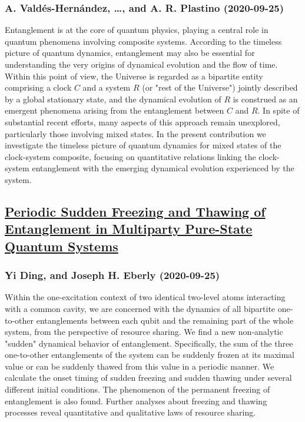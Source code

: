 \subsubsection*{A. Valdés-Hernández, \dots, and A. R. Plastino (2020-09-25)}
Entanglement is at the core of quantum physics, playing a central role in
quantum phenomena involving composite systems. According to the timeless
picture of quantum dynamics, entanglement may also be essential for
understanding the very origins of dynamical evolution and the flow of time.
Within this point of view, the Universe is regarded as a bipartite entity
comprising a clock $C$ and a system $R$ (or "rest of the Universe") jointly
described by a global stationary state, and the dynamical evolution of $R$ is
construed as an emergent phenomena arising from the entanglement between $C$
and $R$. In spite of substantial recent efforts, many aspects of this approach
remain unexplored, particularly those involving mixed states. In the present
contribution we investigate the timeless picture of quantum dynamics for mixed
states of the clock-system composite, focusing on quantitative relations
linking the clock-system entanglement with the emerging dynamical evolution
experienced by the system.

\subsection*{\href{http://arxiv.org/abs/2009.12449v1}{Periodic Sudden Freezing and Thawing of Entanglement in Multiparty  Pure-State Quantum Systems}}
\subsubsection*{Yi Ding, and Joseph H. Eberly (2020-09-25)}
Within the one-excitation context of two identical two-level atoms
interacting with a common cavity, we are concerned with the dynamics of all
bipartite one-to-other entanglements between each qubit and the remaining part
of the whole system, from the perspective of resource sharing. We find a new
non-analytic "sudden" dynamical behavior of entanglement. Specifically, the sum
of the three one-to-other entanglements of the system can be suddenly frozen at
its maximal value or can be suddenly thawed from this value in a periodic
manner. We calculate the onset timing of sudden freezing and sudden thawing
under several different initial conditions. The phenomenon of the permanent
freezing of entanglement is also found. Further analyses about freezing and
thawing processes reveal quantitative and qualitative laws of resource sharing.

